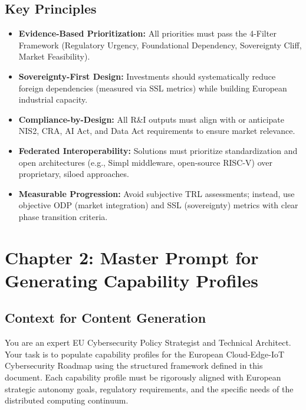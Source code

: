 \documentclass[12pt,a4paper]{article}
\begin{document}
\subsection*{Key Principles}
\begin{itemize}
    \item \textbf{Evidence-Based Prioritization:} All priorities must pass the 4-Filter Framework (Regulatory Urgency, Foundational Dependency, Sovereignty Cliff, Market Feasibility).
    
    \item \textbf{Sovereignty-First Design:} Investments should systematically reduce foreign dependencies (measured via SSL metrics) while building European industrial capacity.
    
    \item \textbf{Compliance-by-Design:} All R\&I outputs must align with or anticipate NIS2, CRA, AI Act, and Data Act requirements to ensure market relevance.
    
    \item \textbf{Federated Interoperability:} Solutions must prioritize standardization and open architectures (e.g., Simpl middleware, open-source RISC-V) over proprietary, siloed approaches.
    
    \item \textbf{Measurable Progression:} Avoid subjective TRL assessments; instead, use objective ODP (market integration) and SSL (sovereignty) metrics with clear phase transition criteria.
\end{itemize}

\newpage
\section{Chapter 2: Master Prompt for Generating Capability Profiles}

\subsection*{Context for Content Generation}
You are an expert EU Cybersecurity Policy Strategist and Technical Architect. Your task is to populate capability profiles for the European Cloud-Edge-IoT Cybersecurity Roadmap using the structured framework defined in this document. Each capability profile must be rigorously aligned with European strategic autonomy goals, regulatory requirements, and the specific needs of the distributed computing continuum.
\end{document}
